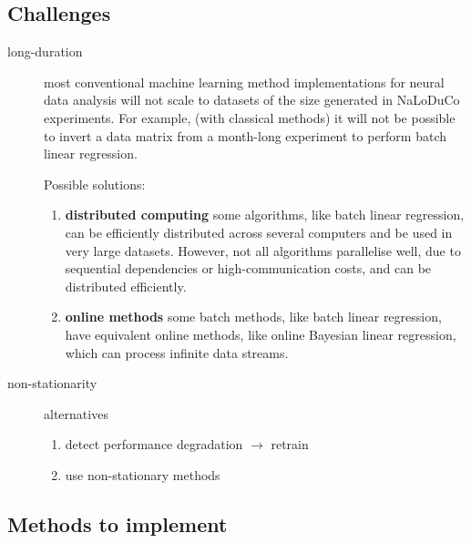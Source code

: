 \documentclass{article}
\begin{document}
\subsection{Challenges}

\begin{description}

    \item[long-duration] most conventional machine learning method
        implementations for neural data analysis will not scale to datasets
        of the size generated in NaLoDuCo experiments. For example, (with
        classical methods) it will not be possible to invert a data matrix
        from a month-long experiment to perform batch linear regression.

        Possible solutions:

        \begin{enumerate}

            \item \textbf{distributed computing} some algorithms, like
                batch linear regression, can be efficiently distributed
                across several computers and be used in very large
                datasets.
                However, not all algorithms parallelise well, due to
                sequential dependencies or high-communication costs, and
                can be distributed efficiently.


            \item \textbf{online methods} some batch methods, like batch
                linear regression,  have equivalent online methods, like
                online Bayesian linear regression, which can process
                infinite data streams.

        \end{enumerate}

    \item[non-stationarity] alternatives

        \begin{enumerate}
            \item detect performance degradation $\rightarrow$ retrain

            \item use non-stationary methods
        \end{enumerate}

\end{description}

\subsection{Methods to implement}
\end{document}
